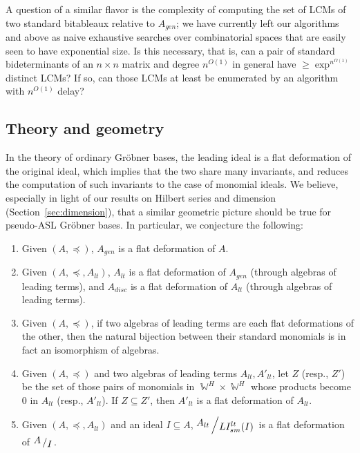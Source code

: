 \documentclass[11pt,reqno]{amsart}
\DeclareMathOperator{\W}{\mathbb{W}}
\newcommand{\bigslant}[2]{{\raisebox{.2em}{$#1$}\left/\raisebox{-.2em}{$#2$}\right.}}
\newcommand{\lismlt}{LI_{sm}^{lt}}
\theoremstyle{definition}
\numberwithin{equation}{section}
\begin{document}
A question of a similar flavor is the complexity of computing the set of LCMs of two standard bitableaux relative to $A_{gen}$; we have currently left our algorithms \getadsh and \getadsbd above as naive exhaustive searches over combinatorial spaces that are easily seen to have exponential size. Is this necessary, that is, can a pair of standard bideterminants of an $n \times n$ matrix and degree $n^{O(1)}$ in general have $\geq \exp^{n^{\Omega(1)}}$ distinct LCMs? If so, can those LCMs at least be enumerated by an algorithm with $n^{O(1)}$ delay? 

\subsection{Theory and geometry}
In the theory of ordinary Gröbner bases, the leading ideal is a flat deformation of the original ideal, which implies that the two share many invariants, and reduces the computation of such invariants to the case of monomial ideals. We believe, especially in light of our results on Hilbert series and dimension (Section~\ref{sec:dimension}), that a similar geometric picture should be true for pseudo-ASL Gröbner bases. In particular, we conjecture the following:

\begin{conjecture} \label{conj:flatdeform}
\begin{enumerate}
\item Given $(A,\preceq)$, $A_{gen}$ is a flat deformation of $A$.

\item Given $(A, \preceq, A_{lt})$, $A_{lt}$ is a flat deformation of $A_{gen}$ (through algebras of leading terms), and $A_{disc}$ is a flat deformation of $A_{lt}$ (through algebras of leading terms).

\item Given $(A,\preceq)$, if two algebras of leading terms are each flat deformations of the other, then the natural bijection between their standard monomials is in fact an isomorphism of algebras.

\item Given $(A,\preceq)$ and two algebras of leading terms $A_{lt}, A'_{lt}$, let $Z$ (resp., $Z'$) be the set of those pairs of monomials in $\W^H \times \W^H$ whose products become $0$ in $A_{lt}$ (resp., $A'_{lt}$). If $Z \subseteq Z'$, then $A'_{lt}$ is a flat deformation of $A_{lt}$.

\item Given $(A,\preceq, A_{lt})$ and an ideal $I \subseteq A$, $\bigslant{A_{lt}}{\lismlt(I)}$ is a flat deformation of $\bigslant{A}{I}$.
\end{enumerate}
\end{conjecture}
\end{document}
